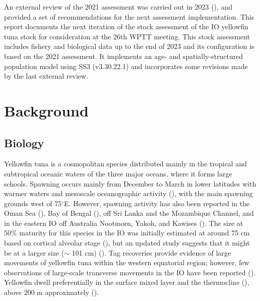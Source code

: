 \documentclass[
]{scrartcl}
\begin{document}
An external review of the 2021 assessment was carried out in 2023
(), and provided a set of recommendations for the next assessment
implementation. This report documents the next iteration of the stock
assessment of the IO yellowfin tuna stock for consideration at the 26th
WPTT meeting. This stock assessment includes fishery and biological data
up to the end of 2023 and its configuration is based on the 2021
assessment. It implements an age- and spatially-structured population
model using SS3 (v3.30.22.1) and incorporates some revisions made by the
last external review.

\section{Background}\label{background}

\subsection{Biology}\label{biology}

Yellowfin tuna is a cosmopolitan species distributed mainly in the
tropical and subtropical oceanic waters of the three major oceans, where
it forms large schools. Spawning occurs mainly from December to March in
lower latitudes with warmer waters and mesoscale oceanographic activity
(), with the main spawning grounds west of 75\(^\circ\)E. However,
spawning activity has also been reported in the Oman Sea
(), Bay of Bengal
(), off Sri Lanka and the Mozambique Channel, and in the eastern IO
off Australia Nootmorn, Yakoh, and Kawises
(). The
size at 50\% maturity for this species in the IO was initially estimated
at around 75 cm based on cortical alveolar stage
(), but an updated study suggests that it might be at a larger size
(\(\sim\) 101 cm)
(). Tag recoveries provide evidence of large movements of yellowfin
tuna within the western equatorial region; however, few observations of
large-scale transverse movements in the IO have been reported
(). Yellowfin dwell preferentially in the surface mixed layer and
the thermocline (), above 200 m approximately
().
\end{document}
